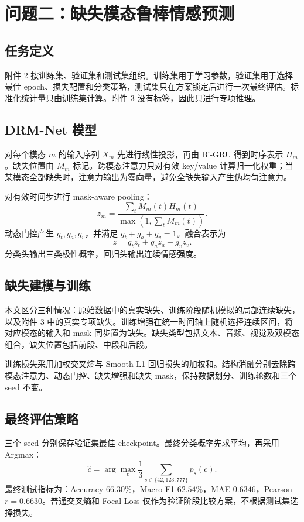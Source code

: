 \section{问题二：缺失模态鲁棒情感预测}

\subsection{任务定义}
附件 2 按训练集、验证集和测试集组织。训练集用于学习参数，验证集用于选择最佳 epoch、损失配置和分类策略，测试集只在方案锁定后进行一次最终评估。标准化统计量只由训练集计算。附件 3 没有标签，因此只进行专项推理。

\subsection{DRM-Net 模型}
对每个模态 $m$ 的输入序列 $X_m$ 先进行线性投影，再由 Bi-GRU 得到时序表示 $H_m$。缺失位置由 $M_m$ 标记。跨模态注意力只对有效 key/value 计算归一化权重；当某模态全部缺失时，注意力输出为零向量，避免全缺失输入产生伪均匀注意力。

对有效时间步进行 mask-aware pooling：
\begin{equation}
z_m=\frac{\sum_t M_m(t)H_m(t)}{\max(1,\sum_tM_m(t))}.
\end{equation}
动态门控产生 $g_t,g_a,g_v$，并满足 $g_t+g_a+g_v=1$。融合表示为
\begin{equation}
z=g_tz_t+g_az_a+g_vz_v.
\end{equation}
分类头输出三类极性概率，回归头输出连续情感强度。

\subsection{缺失建模与训练}
本文区分三种情况：原始数据中的真实缺失、训练阶段随机模拟的局部连续缺失，以及附件 3 中的真实专项缺失。训练增强在统一时间轴上随机选择连续区间，将对应模态的输入和 mask 同步置为缺失。缺失类型包括文本、音频、视觉及双模态组合，缺失位置包括前段、中段和后段。

训练损失采用加权交叉熵与 Smooth L1 回归损失的加权和。结构消融分别去除跨模态注意力、动态门控、缺失增强和缺失 mask，保持数据划分、训练轮数和三个 seed 不变。

\subsection{最终评估策略}
三个 seed 分别保存验证集最佳 checkpoint。最终分类概率先求平均，再采用 Argmax：
\begin{equation}
\widehat c=\arg\max_c\frac{1}{3}\sum_{s\in\{42,123,777\}}p_s(c).
\end{equation}
最终测试指标为：Accuracy $66.30\%$，Macro-F1 $62.54\%$，MAE $0.6346$，Pearson $r=0.6630$。普通交叉熵和 Focal Loss 仅作为验证阶段比较方案，不根据测试集选择损失。

